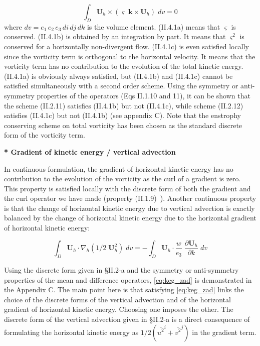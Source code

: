 \documentclass[../tex_main/NEMO_manual]{subfiles}
\begin{document}
\begin{equation} \label{eq:vor_energy}
\int_D {{\textbf{U}}_h \times \left( {\varsigma \;{\textbf{k}}\times {\textbf{U}}_h } \right)\;dv} =0
\end{equation}
where $dv = e_1\, e_2\, e_3\, di\, dj\, dk$ is the volume element.
(II.4.1a) means that $\varsigma $ is conserved. (II.4.1b) is obtained by an integration by part.
It means that $\varsigma^2$ is conserved for a horizontally non-divergent flow.
(II.4.1c) is even satisfied locally since the vorticity term is orthogonal to the horizontal velocity.
It means that the vorticity term has no contribution to the evolution of the total kinetic energy.
(II.4.1a) is obviously always satisfied, but (II.4.1b) and (II.4.1c) cannot be satisfied simultaneously with
a second order scheme.
Using the symmetry or anti-symmetry properties of the operators (Eqs II.1.10 and 11),
it can be shown that the scheme (II.2.11) satisfies (II.4.1b) but not (II.4.1c),
while scheme (II.2.12) satisfies (II.4.1c) but not (II.4.1b) (see appendix C). 
Note that the enstrophy conserving scheme on total vorticity has been chosen as the standard discrete form of
the vorticity term.

\textbf{* Gradient of kinetic energy / vertical advection}

In continuous formulation, the gradient of horizontal kinetic energy has no contribution to the evolution of
the vorticity as the curl of a gradient is zero.
This property is satisfied locally with the discrete form of both the gradient and the curl operator we have made
(property (II.1.9)~).
Another continuous property is that the change of horizontal kinetic energy due to
vertical advection is exactly balanced by the change of horizontal kinetic energy due to
the horizontal gradient of horizontal kinetic energy:

\begin{equation} \label{eq:keg_zad}
\int_D {{\textbf{U}}_h \cdot \nabla _h \left( {1/2\;{\textbf{U}}_h ^2} \right)\;dv} =-\int_D {{\textbf{U}}_h \cdot \frac{w}{e_3 }\;\frac{\partial 
{\textbf{U}}_h }{\partial k}\;dv}
\end{equation}

Using the discrete form given in {\S}II.2-a and the symmetry or anti-symmetry properties of
the mean and difference operators, \autoref{eq:keg_zad} is demonstrated in the Appendix C.
The main point here is that satisfying \autoref{eq:keg_zad} links the choice of the discrete forms of
the vertical advection and of the horizontal gradient of horizontal kinetic energy.
Choosing one imposes the other.
The discrete form of the vertical advection given in {\S}II.2-a is a direct consequence of
formulating the horizontal kinetic energy as $1/2 \left( \overline{u^2}^i + \overline{v^2}^j \right) $ in
the gradient term.
\end{document}
